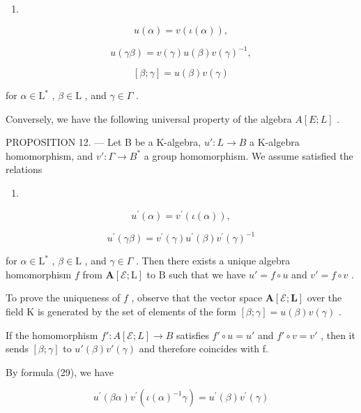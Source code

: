 \begin{enumerate}
\def\labelenumi{(\arabic{enumi})}
\setcounter{enumi}{25}
\tightlist
\item
\end{enumerate}

\[
u (\alpha) = v (\iota (\alpha)),\tag{27}
\]

\[
u (\gamma \beta) = v (\gamma) u (\beta) v (\gamma) ^ {- 1},\tag{28}
\]

\[
[ \beta ; \gamma ] = u (\beta) v (\gamma)
\]

for \(\alpha \in \mathrm{L}^*\) , \(\beta \in \mathrm{L}\) , and \(\gamma \in \Gamma\) .

Conversely, we have the following universal property of the algebra \(A[E;L]\) .

PROPOSITION 12. --- Let B be a K-algebra, \(u' : L \to B\) a K-algebra homomorphism, and \(v' : \Gamma \to B^{*}\) a group homomorphism. We assume satisfied the relations

\begin{enumerate}
\def\labelenumi{(\arabic{enumi})}
\setcounter{enumi}{28}
\tightlist
\item
\end{enumerate}

\[
u ^ {\prime} (\alpha) = v ^ {\prime} (\iota (\alpha)),\tag{30}
\]

\[
u ^ {\prime} (\gamma \beta) = v ^ {\prime} (\gamma) u ^ {\prime} (\beta) v ^ {\prime} (\gamma) ^ {- 1}
\]

for \(\alpha \in \mathrm{L}^*\) , \(\beta \in \mathrm{L}\) , and \(\gamma \in \Gamma\) . Then there exists a unique algebra homomorphism \(f\) from \(\mathbf{A}[\mathcal{E};\mathrm{L}]\) to \(\mathrm{B}\) such that we have \(u' = f \circ u\) and \(v' = f \circ v\) .

To prove the uniqueness of \(f\) , observe that the vector space \(\mathbf{A}[\mathcal{E};\mathbf{L}]\) over the field \(\mathrm{K}\) is generated by the set of elements of the form \([\beta ;\gamma ] = u(\beta)v(\gamma)\) .

If the homomorphism \(f' : A[\mathcal{E}; L] \to B\) satisfies \(f' \circ u = u'\) and \(f' \circ v = v'\) , then it sends \([\beta; \gamma]\) to \(u'(\beta)v'(\gamma)\) and therefore coincides with f.

By formula (29), we have

\[
u ^ {\prime} (\beta \alpha) v ^ {\prime} (\iota (\alpha) ^ {- 1} \gamma) = u ^ {\prime} (\beta) v ^ {\prime} (\gamma)\tag{31}
\]

